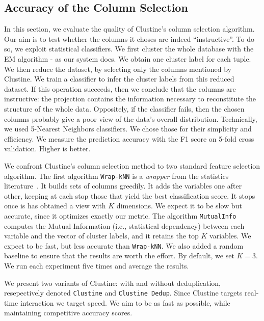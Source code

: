 \subsection{Accuracy of the Column Selection}
\label{sec:accuracy}
In this section, we evaluate the quality of Clustine's column selection
algorithm. Our aim is to test whether the columns it choses are indeed
``instructive''.  To do so, we exploit statistical classifiers. We first
cluster the whole database with the EM algorithm - as our system does. We
obtain one cluster label for each tuple. We then reduce the dataset, by
selecting only the columns mentioned by Clustine. We train a classifier to
infer the cluster labels from this reduced dataset.  If this operation
succeeds, then we conclude that the columns are instructive: the projection
contains the information necessary to reconstitute the structure of the whole
data.  Oppositely, if the classifier fails, then the chosen columns probably
give a poor view of the data's overall distribution.  Technically, we used
5-Nearest Neighbors classifiers. We chose those for their simplicity and
efficiency.  We measure the prediction accuracy with the F1 score on 5-fold
cross validation.  Higher is better.

We confront Clustine's column selection method to two standard feature
selection algorithm.  The first algorithm \texttt{Wrap-kNN} is a \emph{wrapper}
from the statistics literature~\cite{guyon2003introduction}. It builds sets of
columns greedily. It adds the variables one after other, keeping at each stop
those that yield the best classification score. It stops once is has obtained a
view with $K$ dimensions. We expect it to be slow but accurate, since it
optimizes exactly our metric. The algorithm \texttt{MutualInfo} computes the
Mutual Information (i.e., statistical dependency) between each variable and the
vector of cluster labels, and it retains the top $K$ variables. We expect
to be fast, but less accurate than \texttt{Wrap-kNN}. We also added a random
baseline to ensure that the results are worth the effort.  By default, we set
$K=3$. We run each experiment five times and average the results. 

We present two variants of Clustine: with and without deduplication,
resepectively denoted \texttt{Clustine} and \texttt{Clustine Dedup}. Since
Clustine targets real-time interaction we target speed. We aim to be as fast as
possible, while maintaining competitive accuracy scores.

